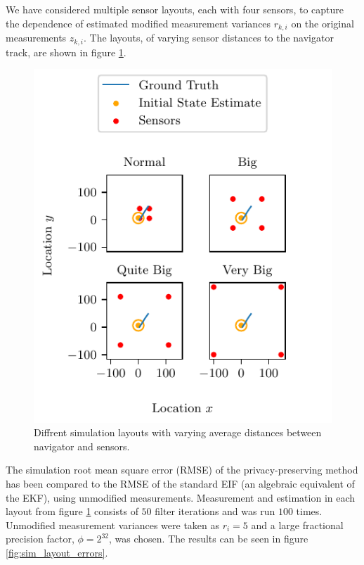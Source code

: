 \documentclass[10pt,letterpaper,oneside,twocolumn,journal]{IEEEtran}
\theoremstyle{definition}
\theoremstyle{definition}
\theoremstyle{remark}
\begin{document}
We have considered multiple sensor layouts, each with four sensors, to capture the dependence of estimated modified measurement variances $r_{k,i}$ on the original measurements $z_{k,i}$. The layouts, of varying sensor distances to the navigator track, are shown in figure \ref{fig:sim_layouts}.
\begin{figure}[htbp]
    \centering
    \includegraphics{images/layouts.pdf}
    \caption{Diffrent simulation layouts with varying average distances between navigator and sensors.}
    \label{fig:sim_layouts}
\end{figure}
The simulation root mean square error (RMSE) of the privacy-preserving method has been compared to the RMSE of the standard EIF (an algebraic equivalent of the EKF), using unmodified measurements. Measurement and estimation in each layout from figure \ref{fig:sim_layouts} consists of $50$ filter iterations and was run $100$ times. Unmodified measurement variances were taken as $r_i=5$ and a large fractional precision factor, $\phi=2^{32}$, was chosen. The results can be seen in figure \ref{fig:sim_layout_errors}.
\end{document}
